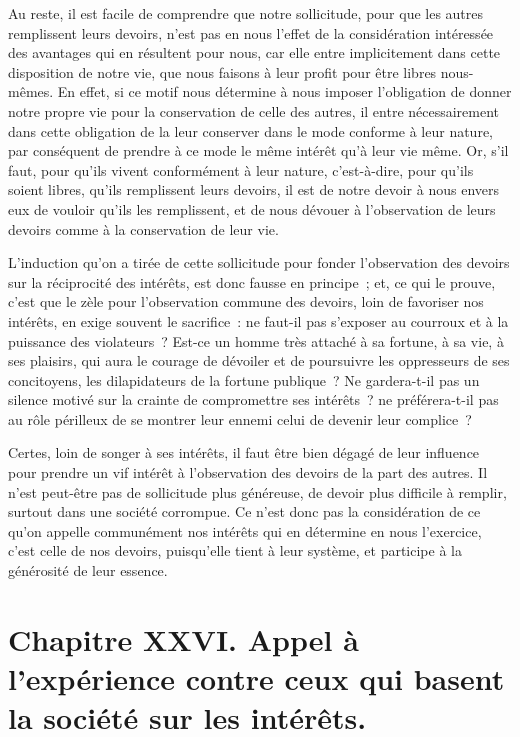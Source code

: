 \documentclass[french,twoside]{book} %
\newcommand\chapteropen{} %
\newcommand\chapterclose{} %
\begin{document}
Au reste, il est facile de comprendre que notre sollicitude, pour que les autres remplissent leurs devoirs, n’est pas en nous l’effet de la considération intéressée des avantages qui en résultent pour nous, car elle entre implicitement dans cette disposition de notre vie, que nous faisons à leur profit pour être libres nous-mêmes. En effet, si ce motif nous détermine à nous imposer l’obligation de donner notre propre vie pour la conservation de celle des autres, il entre nécessairement dans cette obligation de la leur conserver dans le mode conforme à leur nature, par conséquent de prendre à ce mode le même intérêt qu’à leur vie même. Or, s’il faut, pour qu’ils vivent conformément à leur nature, c’est-à-dire, pour qu’ils soient libres, qu’ils remplissent leurs devoirs, il est de notre devoir à nous envers eux de vouloir qu’ils les remplissent, et de nous dévouer à l’observation de leurs devoirs comme à la conservation de leur vie.\par
L’induction qu’on a tirée de cette sollicitude pour fonder l’observation des devoirs sur la réciprocité des intérêts, est donc fausse en principe ; et, ce qui le prouve, c’est que le zèle pour l’observation commune des devoirs, loin de favoriser nos intérêts, en exige souvent le sacrifice : ne faut-il pas s’exposer au courroux et à la puissance des violateurs ? Est-ce un homme très attaché à sa fortune, à sa vie, à ses plaisirs, qui aura le courage de dévoiler et de poursuivre les oppresseurs de ses concitoyens, les dilapidateurs de la fortune publique ? Ne gardera-t-il pas un silence motivé sur la crainte de compromettre ses intérêts ? ne préférera-t-il pas au rôle périlleux de se montrer leur ennemi celui de devenir leur complice ?\par
Certes, loin de songer à ses intérêts, il faut être bien dégagé de leur influence pour prendre un vif intérêt à l’observation des devoirs de la part des autres. Il n’est peut-être pas de sollicitude plus généreuse, de devoir plus difficile à remplir, surtout dans une société corrompue. Ce n’est donc pas la considération de ce qu’on appelle communément nos intérêts qui en détermine en nous l’exercice, c’est celle de nos devoirs, puisqu’elle tient à leur système, et participe à la générosité de leur essence.
\chapterclose


\chapteropen
\chapter[{Chapitre XXVI. Appel à l’expérience contre ceux qui basent la société sur les intérêts.}]{Chapitre XXVI. Appel à l’expérience contre ceux qui basent la société sur les intérêts.}\renewcommand{\leftmark}{Chapitre XXVI. Appel à l’expérience contre ceux qui basent la société sur les intérêts.}
\end{document}

